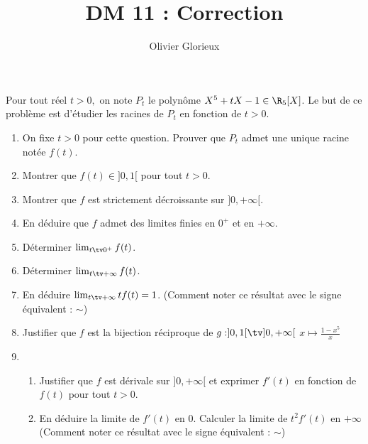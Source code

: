 \documentclass[a4paper, 11pt,reqno]{article}
\author{Olivier Glorieux}
\begin{document}
\title{DM 11 : Correction}



\begin{exercice}
Pour tout réel $t>0, $ on note $P_t$ le polynôme $X^5 +tX-1 \in \R_5[X]$. Le but de ce problème est d'étudier les racines de $P_t$ en fonction de $t>0$. 
\begin{enumerate}
\item On fixe $t>0$ pour cette question. Prouver que $P_t$ admet une unique racine notée $f(t)$. 
\item Montrer que $f(t) \in ]0,1[$ pour tout $t>0.$
\item Montrer que $f$ est strictement décroissante sur $]0,+\infty[$.
\item En déduire que $f$ admet des limites finies en $0^+$ et en $+\infty$.

\item Déterminer $\lim_{t\tv 0^+} f(t)$. 

\item Déterminer $\lim_{t\tv+\infty} f(t)$. 
\item En déduire  $\lim_{t\tv +\infty} tf(t)= 1$. (Comment noter ce résultat avec le signe équivalent : $\sim$) 

\item Justifier que $f$ est la bijection réciproque de $g : ]0,1[\tv ]0,+\infty[$ 
$x \mapsto\frac{1-x^5}{x}$
\item \begin{enumerate}
\item Justifier que $f$ est dérivale sur $]0,+\infty[ $ et exprimer $f'(t)$ en fonction de $f(t)$ pour tout $t>0$.
\item En déduire la limite de $f'(t)$ en $0$. Calculer la limite de $t^2 f'(t)$ en $+\infty$ (Comment noter ce résultat avec le signe équivalent : $\sim$) 
\end{enumerate}
\end{enumerate}
\end{exercice}
\end{document}
